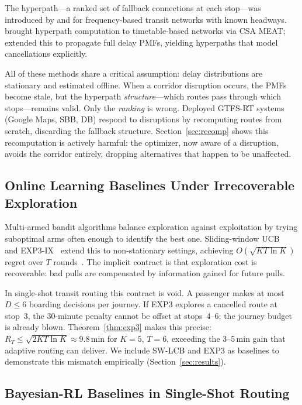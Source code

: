 \documentclass[opre,dblanonrev]{informs4}
\begin{document}
The hyperpath---a ranked set of fallback connections at each stop---was
introduced by \citet{spiess1989} and
\citet{nguyen1988} for frequency-based transit
networks with known headways.
\citet{dibbelt2013} brought hyperpath computation to
timetable-based networks via CSA MEAT;
\citet{durner2024} extended this to propagate full delay PMFs,
yielding hyperpaths that model cancellations explicitly.

All of these methods share a critical assumption: delay distributions are
stationary and estimated offline.
When a corridor disruption occurs, the PMFs become stale, but the hyperpath
\emph{structure}---which routes pass through which stops---remains valid.
Only the \emph{ranking} is wrong.
Deployed GTFS-RT systems~\citep{gtfsrt2023} (Google Maps, SBB, DB) respond
to disruptions by recomputing routes from scratch, discarding the fallback
structure.
Section~\ref{sec:recomp} shows this recomputation is actively harmful:
the optimizer, now aware of a disruption, avoids the corridor entirely,
dropping alternatives that happen to be unaffected.

\subsection{Online Learning Baselines Under Irrecoverable Exploration}

Multi-armed bandit algorithms balance exploration against exploitation by
trying suboptimal arms often enough to identify the best one.
Sliding-window UCB~\citep{garivier2011} and EXP3-IX~\citep{kocak2014} extend
this to non-stationary settings, achieving $O(\sqrt{KT\ln K})$ regret
over $T$ rounds~\citep{lai1985,garivier2011,kocak2014}.
The implicit contract is that exploration cost is recoverable: bad pulls
are compensated by information gained for future pulls.

In single-shot transit routing this contract is void.
A passenger makes at most $D \leq 6$ boarding decisions per journey.
If EXP3 explores a cancelled route at stop~3, the 30-minute penalty
cannot be offset at stops~4--6; the journey budget is already blown.
Theorem~\ref{thm:exp3} makes this precise:
$R_T \leq \sqrt{2KT\ln K} \approx 9.8$\,min for $K{=}5$, $T{=}6$,
exceeding the 3--5\,min gain that adaptive routing can deliver.
We include SW-LCB and EXP3 as baselines to demonstrate this mismatch
empirically (Section~\ref{sec:results}).

\subsection{Bayesian-RL Baselines in Single-Shot Routing}
\end{document}
